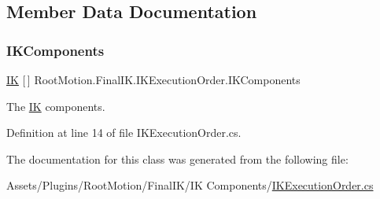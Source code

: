 \subsection{Member Data Documentation}
\mbox{\label{class_root_motion_1_1_final_i_k_1_1_i_k_execution_order_a196c759e4337cd52978b841cc1467780}} 
\subsubsection{\texorpdfstring{I\+K\+Components}{IKComponents}}
{\footnotesize\ttfamily \mbox{\hyperlink{class_root_motion_1_1_final_i_k_1_1_i_k}{IK}} \mbox{[}$\,$\mbox{]} Root\+Motion.\+Final\+I\+K.\+I\+K\+Execution\+Order.\+I\+K\+Components}



The \mbox{\hyperlink{class_root_motion_1_1_final_i_k_1_1_i_k}{IK}} components. 



Definition at line 14 of file I\+K\+Execution\+Order.\+cs.



The documentation for this class was generated from the following file\+:\begin{DoxyCompactItemize}
\item 
Assets/\+Plugins/\+Root\+Motion/\+Final\+I\+K/\+I\+K Components/\mbox{\hyperlink{_i_k_execution_order_8cs}{I\+K\+Execution\+Order.\+cs}}\end{DoxyCompactItemize}
